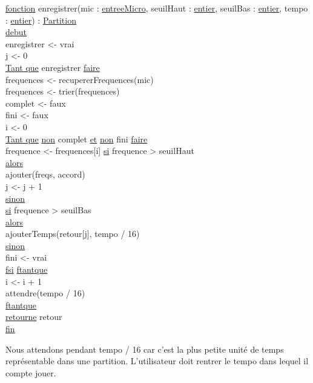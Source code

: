 \begin{tabbing}
\ul{fonction} enregistrer(mic : \ul{entreeMicro}, seuilHaut :  \ul{entier}, seuilBas : \ul{entier}, tempo : \ul{entier}) : \ul{Partition}\\
\ul{debut}\\
enregistrer <- vrai\\
j <- 0\\
\ul{Tant que} enregistrer \ul{faire}\\
    frequences <- recupererFrequences(mic)\\
    frequences <- trier(frequences)\\
    complet <- faux\\
    fini <- faux\\
    i <- 0 \\
    \ul{Tant que} \ul{non} complet \ul{et} \ul{non} fini \ul{faire}\\
        frequence <- frequences[i]
        \ul{si} frequence > seuilHaut\\
        \ul{alors}\\
            ajouter(freqs, accord)\\
            j <- j + 1\\
        \ul{sinon}\\
            \ul{si} frequence > seuilBas\\
            \ul{alors}\\ 
                ajouterTemps(retour[j], tempo / 16)\\
            \ul{sinon}\\
                fini <- vrai\\
        \ul{fsi}
    \ul{ftantque}\\     
    i <- i + 1\\  
    attendre(tempo / 16)\\
\ul{ftantque}\\
\ul{retourne} retour \\
\ul{fin}\\
\end{tabbing}

Nous attendons pendant tempo / 16 car c'est la plus petite unité de temps représentable dans une partition. L'utilisateur doit rentrer le tempo dans lequel il compte jouer.